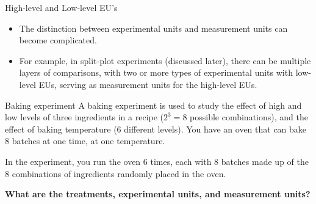 \begin{frame}[allowframebreaks]{High-level and Low-level EU’s}
  \begin{itemize}
    \item The distinction between experimental units and measurement units can become complicated.
    \item For example, in split-plot experiments (discussed later), there can be multiple layers of comparisons, with two or more types of experimental units with \alert{low-level EUs}, serving as measurement units for the \alert{high-level EUs}.
  \end{itemize}
  
  
  \framebreak
  
  \begin{exampleblock}{Baking experiment}
    A baking experiment is used to study the effect of high and low levels of three ingredients in a recipe ($2^3 = 8$ possible combinations), and the effect of baking temperature (6 different levels). You have an oven that can bake 8 batches at one time, at one temperature.
    
    In the experiment, you run the oven 6 times, each with 8 batches made up of the 8 combinations of ingredients randomly placed in the oven. 
  \end{exampleblock}
  
  \textbf{What are the treatments, experimental units, and measurement units?}
  
  
\end{frame}

